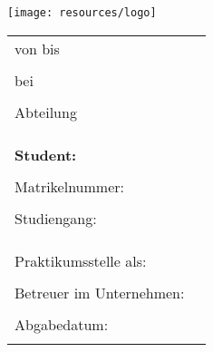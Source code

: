 
\begin{titlepage}


\vspace*{-5cm}

\begin{flushleft}
	\hspace*{-3cm} \texttt{[image: resources/logo]}
\end{flushleft}

\vspace{0.5cm}

\begin{flushleft}
	\Huge{\textbf{\thema}}
\end{flushleft}

\vspace{0.5cm}

\begin{flushleft}
	\begin{tabular}{@{}p{5cm}p{8.5cm}}
		von \von{} bis \bis & \\
		& \\
		bei \firma & \\
		& \\
		Abteilung \abteilung & \\
		& \\
		& \\
		& \\
		\textbf{Student:} & \textbf{\autor} \\
		& \\
		Matrikelnummer: & \matrikelnummer \\
		& \\
		Studiengang: & \studiengang \\
		& \\
		& \\
		& \\
		Praktikumsstelle als: & \praktikumsstelle  \\[.5ex]
		& \\
		Betreuer im Unternehmen: & \betreuer  \\[.5ex]
		& \\
		Abgabedatum: & \abgabedatum \\
		& \\
	\end{tabular}
\end{flushleft}

\iffalse
\begin{center}
	\Huge{
		\textbf{\thema} \\[5cm]
	}
	\huge{
		\textbf{\autor}} \\[1cm]
	\normalsize{
		\textbf{Praktikant als \praktikumsstelle}} \\[0.5cm]
	\normalsize{
		\textbf{bei}} \\[0.5cm]
	\normalsize{
		\textbf{\firma} \\[6.5cm]
	}
	\Large{
		\textbf{Konstanz, \abgabedatum} \\[2.3cm]
	}
	
\end{center}
\fi

\end{titlepage}